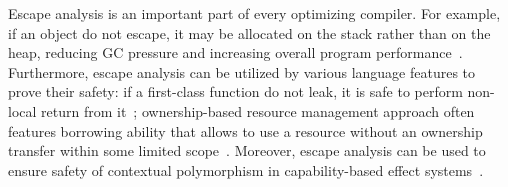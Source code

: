 \documentclass[11pt]{article}
\begin{document}
    Escape analysis is an important part of every optimizing compiler.
    For example, if an object do not escape, it may be allocated on the stack rather than on the heap, reducing GC pressure and increasing overall program performance~\cite{blanchet1999escape}.
    Furthermore, escape analysis can be utilized by various language features to prove their safety: if a first-class function do not leak, it is safe to perform non-local return from it~\cite{akhin2021kotlin}; ownership-based resource management approach often features borrowing ability that allows to use a resource without an ownership transfer within some limited scope~\cite{matsakis2014rust, lorenzen2024oxidizing}. %
    Moreover, escape analysis can be used to ensure safety of contextual polymorphism in capability-based effect systems~\cite{odersky2022scoped, boruch2023capturing}.







\end{document}
